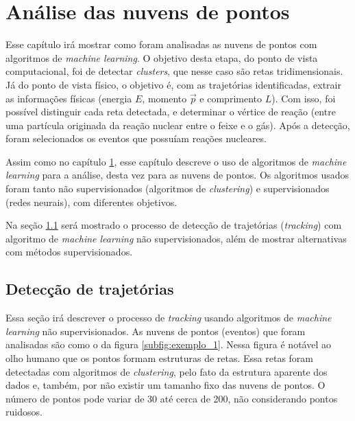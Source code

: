 \documentclass[a4paper,12pt,oneside]{book}
\begin{document}
\chapter{Análise das nuvens de pontos}\label{chapter:point_cloud_analysis}

\par Esse capítulo irá mostrar como foram analisadas as nuvens de pontos com algoritmos de \textit{machine learning}. O objetivo desta etapa, do ponto de vista computacional, foi de detectar \textit{clusters}, que nesse caso são retas tridimensionais. Já do ponto de vista físico, o objetivo é, com as trajetórias identificadas, extrair as informações físicas (energia $E$, momento $\vec{p}$ e comprimento $L$). Com isso, foi possível distinguir cada reta detectada, e determinar o vértice de reação (entre uma partícula originada da reação nuclear entre o feixe e o gás). Após a detecção, foram selecionados os eventos que possuíam reações nucleares.

\par Assim como no capítulo \ref{chapter:point_cloud_analysis}, esse capítulo descreve o uso de algoritmos de \textit{machine learning} para a análise, desta vez para as nuvens de pontos. Os algoritmos usados foram tanto não supervisionados (algoritmos de \textit{clustering}) e supervisionados (redes neurais), com diferentes objetivos.

\par Na seção \ref{sec:forcabruta} será mostrado o processo de detecção de trajetórias (\textit{tracking}) com algoritmo de \textit{machine learning} não supervisionados, além de mostrar alternativas com métodos supervisionados. 



\section{Detecção de trajetórias}\label{sec:forcabruta}

\par Essa seção irá descrever o processo de \textit{tracking} usando algoritmos de \textit{machine learning} não supervisionados. As nuvens de pontos (eventos) que foram analisadas são como o da figura \ref{subfig:exemplo_1}. Nessa figura é notável ao olho humano que os pontos formam estruturas de retas. Essa retas foram detectadas com algoritmos de \textit{clustering}, pelo fato da estrutura aparente dos dados e, também, por não existir um tamanho fixo das nuvens de pontos. O número de pontos pode variar de 30 até cerca de 200, não considerando pontos ruidosos.
\end{document}
